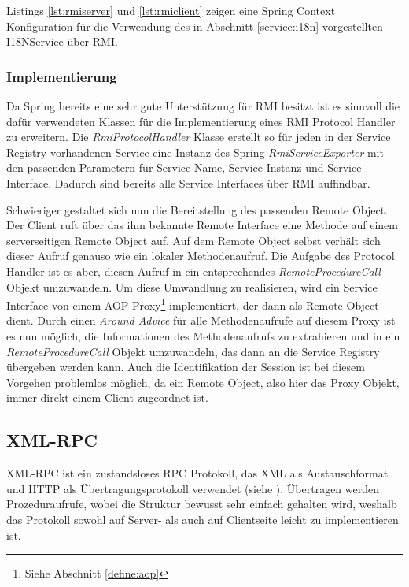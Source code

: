 Listings \ref{lst:rmiserver} und \ref{lst:rmiclient} zeigen eine Spring Context
Konfiguration für die Verwendung des in Abschnitt \ref{service:i18n}
vorgestellten I18NService über \ac{RMI}.

\lstset{language=xml}




\subsubsection{Implementierung}
Da Spring bereits eine sehr gute Unterstützung für \ac{RMI} besitzt ist es
sinnvoll die dafür verwendeten Klassen für die Implementierung eines \ac{RMI}
Protocol Handler zu erweitern. Die \emph{RmiProtocolHandler} Klasse erstellt so für jeden
in der Service Registry vorhandenen Service eine Instanz des Spring
\emph{RmiServiceExporter} mit den passenden Parametern für Service Name, Service
Instanz und Service Interface. Dadurch sind bereits alle Service Interfaces über
\ac{RMI} auffindbar.

Schwieriger gestaltet sich nun die Bereitstellung des passenden Remote Object.
Der Client ruft über das ihm bekannte Remote Interface eine Methode auf einem
serverseitigen Remote Object auf. Auf dem Remote Object selbst verhält sich
dieser Aufruf genauso wie ein lokaler Methodenaufruf. Die Aufgabe des Protocol
Handler ist es aber, diesen Aufruf in ein entsprechendes
\emph{RemoteProcedureCall} Objekt umzuwandeln. Um diese Umwandlung zu
realisieren, wird ein Service Interface von einem \ac{AOP} Proxy\footnote{Siehe Abschnitt
\ref{define:aop}} implementiert, der dann als Remote Object dient. Durch einen
\emph{Around Advice} für alle Methodenaufrufe auf diesem Proxy ist es nun
möglich, die Informationen des Methodenaufrufs zu extrahieren und in ein
\emph{RemoteProcedureCall} Objekt umzuwandeln, das dann an die Service Registry
übergeben werden kann. Auch die Identifikation der Session ist bei diesem
Vorgehen problemlos möglich, da ein Remote Object, also hier das Proxy Objekt,
immer direkt einem Client zugeordnet ist.

\subsection{XML-RPC}\label{subsec:xmlrpc}
XML-RPC ist ein zustandsloses \ac{RPC} Protokoll, das \ac{XML} als
Austauschformat und \ac{HTTP} als Übertragungsprotokoll verwendet (siehe
\cite{winer:1999}). Übertragen werden Prozeduraufrufe, wobei die Struktur bewusst
sehr einfach gehalten wird, weshalb das Protokoll sowohl auf Server- als auch auf
Clientseite leicht zu implementieren ist.

